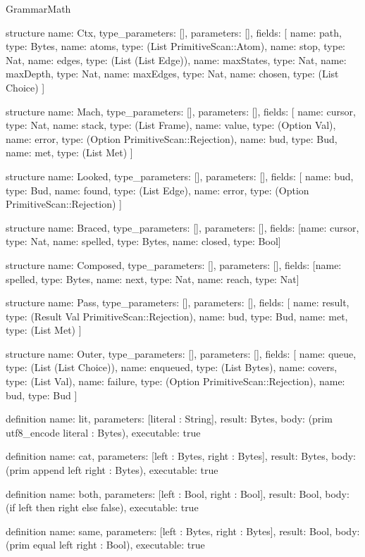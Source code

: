 \begin{lexlean}{GrammarMath}
\begin{semanticmodule}
structure{
  name: Ctx,
  type_parameters: [],
  parameters: [],
  fields: [
    {name: path, type: Bytes},
    {name: atoms, type: (List PrimitiveScan::Atom)},
    {name: stop, type: Nat},
    {name: edges, type: (List (List Edge))},
    {name: maxStates, type: Nat},
    {name: maxDepth, type: Nat},
    {name: maxEdges, type: Nat},
    {name: chosen, type: (List Choice)}
  ]
}

structure{
  name: Mach,
  type_parameters: [],
  parameters: [],
  fields: [
    {name: cursor, type: Nat},
    {name: stack, type: (List Frame)},
    {name: value, type: (Option Val)},
    {name: error, type: (Option PrimitiveScan::Rejection)},
    {name: bud, type: Bud},
    {name: met, type: (List Met)}
  ]
}

structure{
  name: Looked,
  type_parameters: [],
  parameters: [],
  fields: [
    {name: bud, type: Bud},
    {name: found, type: (List Edge)},
    {name: error, type: (Option PrimitiveScan::Rejection)}
  ]
}

structure{
  name: Braced,
  type_parameters: [],
  parameters: [],
  fields: [{name: cursor, type: Nat}, {name: spelled, type: Bytes}, {name: closed, type: Bool}]
}

structure{
  name: Composed,
  type_parameters: [],
  parameters: [],
  fields: [{name: spelled, type: Bytes}, {name: next, type: Nat}, {name: reach, type: Nat}]
}

structure{
  name: Pass,
  type_parameters: [],
  parameters: [],
  fields: [
    {name: result, type: (Result Val PrimitiveScan::Rejection)},
    {name: bud, type: Bud},
    {name: met, type: (List Met)}
  ]
}

structure{
  name: Outer,
  type_parameters: [],
  parameters: [],
  fields: [
    {name: queue, type: (List (List Choice))},
    {name: enqueued, type: (List Bytes)},
    {name: covers, type: (List Val)},
    {name: failure, type: (Option PrimitiveScan::Rejection)},
    {name: bud, type: Bud}
  ]
}

definition{
  name: lit,
  parameters: [literal : String],
  result: Bytes,
  body: (prim utf8_encode literal : Bytes),
  executable: true
}

definition{
  name: cat,
  parameters: [left : Bytes, right : Bytes],
  result: Bytes,
  body: (prim append left right : Bytes),
  executable: true
}

definition{
  name: both,
  parameters: [left : Bool, right : Bool],
  result: Bool,
  body: (if left then right else false),
  executable: true
}

definition{
  name: same,
  parameters: [left : Bytes, right : Bytes],
  result: Bool,
  body: (prim equal left right : Bool),
  executable: true
}


\end{semanticmodule}
\end{lexlean}
